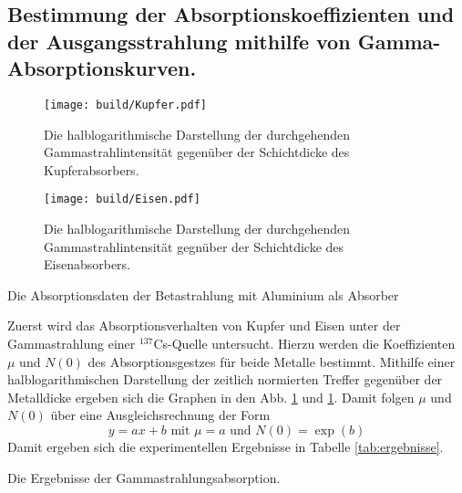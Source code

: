 \subsection{Bestimmung der Absorptionskoeffizienten und der Ausgangsstrahlung mithilfe von Gamma-Absorptionskurven.}

\begin{figure}
 \centering
 \caption{Die halblogarithmische Darstellung der durchgehenden Gammastrahlintensität gegenüber der Schichtdicke des Kupferabsorbers.}
 \texttt{[image: build/Kupfer.pdf]}
 \label{fig:kupfer}
\end{figure}

\begin{figure}
 \centering
 \caption{Die halblogarithmische Darstellung der durchgehenden Gammastrahlintensität gegnüber der Schichtdicke des Eisenabsorbers.}
 \texttt{[image: build/Eisen.pdf]}
 \label{fig:eisen}
\end{figure}

\begin{table}
 \centering
 \caption{Die Absorptionsdaten der Betastrahlung mit Aluminium als Absorber }
 
 \label{tab:betaJ}
\end{table}

Zuerst wird das Absorptionsverhalten von Kupfer und Eisen unter der Gammastrahlung einer $^{137}$Cs-Quelle untersucht. Hierzu werden die Koeffizienten $\mu$ und $N(0)$ des Absorptionsgestzes für beide Metalle bestimmt. Mithilfe einer halblogarithmischen Darstellung der zeitlich normierten Treffer gegenüber der Metalldicke ergeben sich die Graphen in  den Abb. \ref{fig:kupfer} und \ref{fig:kupfer}. Damit folgen $\mu$ und $N(0)$ über eine Ausgleichsrechnung der Form
\begin{equation}
y = a x+ b \text{ mit } \mu = a \text{ und } N(0) = \exp(b)
\end{equation} Damit ergeben sich die experimentellen Ergebnisse in Tabelle \ref{tab:ergebnisse}.

\begin{table}
 \centering
 \caption{Die Ergebnisse der Gammastrahlungsabsorption.}
 
 \label{tab:erg1}
\end{table}

